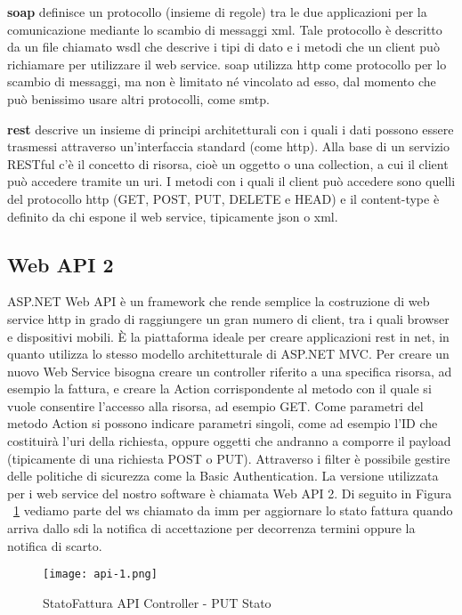 \textbf{\Gls{soap}} \cite{soap} definisce un protocollo (insieme di regole) tra le due applicazioni per la comunicazione mediante lo scambio di messaggi \Gls{xml}.
Tale protocollo è descritto da un file chiamato \Gls{wsdl} che descrive i tipi di dato e i metodi che un client può richiamare per utilizzare il web service.
\Gls{soap} utilizza \Gls{http} come protocollo per lo scambio di messaggi, ma non è limitato né vincolato ad esso, dal momento che può benissimo usare altri protocolli, come \Gls{smtp}.

\textbf{\Gls{rest}} descrive un insieme di principi architetturali con i quali i dati possono essere trasmessi attraverso un'interfaccia standard (come \Gls{http}).
Alla base di un servizio RESTful c'è il concetto di risorsa, cioè un oggetto o una collection, a cui il client può accedere tramite un \Gls{uri}.
I metodi con i quali il client può accedere sono quelli del protocollo \Gls{http} (GET, POST, PUT, DELETE e HEAD) e il content-type è definito da chi espone il web service, tipicamente \Gls{json} o \Gls{xml}.


\subsection{Web API 2}

ASP.NET Web API \cite{web-api} è un framework che rende semplice la costruzione di web service \Gls{http} in grado di raggiungere un gran numero di client, tra i quali browser e dispositivi mobili.
È la piattaforma ideale per creare applicazioni \Gls{rest} in \Gls{net}, in quanto utilizza lo stesso modello architetturale di ASP.NET MVC.
Per creare un nuovo Web Service bisogna creare un controller riferito a una specifica risorsa, ad esempio la fattura, e creare la Action corrispondente al metodo con il quale si vuole consentire l'accesso alla risorsa, ad esempio GET.
Come parametri del metodo Action si possono indicare parametri singoli, come ad esempio l'ID che costituirà l'\Gls{uri} della richiesta, oppure oggetti che andranno a comporre il payload (tipicamente di una richiesta POST o PUT).
Attraverso i filter è possibile gestire delle politiche di sicurezza come la Basic Authentication.
La versione utilizzata per i web service del nostro software è chiamata Web API 2.
Di seguito in Figura ~\ref{fig:Api1} vediamo parte del \Gls{ws} chiamato da \Gls{imm} per aggiornare lo stato fattura quando arriva dallo \Gls{sdi} la notifica di accettazione per decorrenza termini oppure la notifica di scarto.

\begin{figure}[H]
    \centering
    \texttt{[image: api-1.png]}
    \caption{StatoFattura API Controller - PUT Stato }
    \label{fig:Api1}
\end{figure}